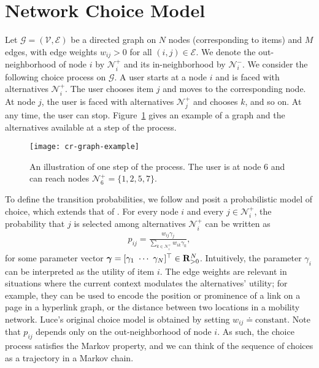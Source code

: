 \section{Network Choice Model}  %
\label{cr:sec:model}

Let $\mathcal{G} = (\mathcal{V}, \mathcal{E})$ be a directed graph on $N$ nodes (corresponding to items) and $M$ edges, with edge weights $w_{ij} > 0$ for all $(i, j) \in \mathcal{E}$.
We denote the out-neighborhood of node $i$ by $\mathcal{N}^+_i$ and its in-neighborhood by $\mathcal{N}^-_i$.
We consider the following choice process on $\mathcal{G}$.
A user starts at a node $i$ and is faced with alternatives $\mathcal{N}^+_i$.
The user chooses item $j$ and moves to the corresponding node.
At node $j$, the user is faced with alternatives $\mathcal{N}^+_j$ and chooses $k$, and so on.
At any time, the user can stop.
Figure~\ref{cr:fig:samplenet} gives an example of a graph and the alternatives available at a step of the process.

\begin{figure}
  \centering
  \texttt{[image: cr-graph-example]}
  \caption{An illustration of one step of the process.
  The user is at node 6 and can reach nodes $\mathcal{N}^+_6 = \{1, 2, 5, 7\}$.}
  \label{cr:fig:samplenet}
\end{figure}

To define the transition probabilities, we follow \citet{kumar2015inverting} and posit a probabilistic model of choice, which extends that of \citet{luce1959individual}.
For every node $i$ and every $j \in \mathcal{N}^+_i$, the probability that $j$ is selected among alternatives $\mathcal{N}^+_i$ can be written as
\begin{align}
\label{cr:eq:singlelik}
p_{ij} = \frac{w_{ij} \gamma_j}{\sum_{k \in \mathcal{N}^+_i} w_{ik} \gamma_k},
\end{align}
for some parameter vector $\bm{\gamma} = [\gamma_1 \ \cdots \ \gamma_N]^\Tr \in \mathbf{R}_{>0}^N$.
Intuitively, the parameter $\gamma_i$ can be interpreted as the utility of item $i$.
The edge weights are relevant in situations where the current context modulates the alternatives' utility;
for example, they can be used to encode the position or prominence of a link on a page in a hyperlink graph, or the distance between two locations in a mobility network.
Luce's original choice model is obtained by setting $w_{ij} \doteq \text{constant}$.
Note that $p_{ij}$ depends only on the out-neighborhood of node $i$.
As such, the choice process satisfies the Markov property, and we can think of the sequence of choices as a trajectory in a Markov chain.

